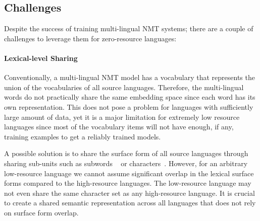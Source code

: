 \subsection{Challenges}
Despite the success of training multi-lingual NMT systems; there are a couple of challenges to leverage them for zero-resource languages:

\paragraph{Lexical-level Sharing} Conventionally, a multi-lingual NMT model has a vocabulary that represents the union of the vocabularies of all source languages. Therefore, the multi-lingual words do not practically share the same embedding space since each word has its own representation. This does not pose a problem for languages  with sufficiently large amount of  data, yet it is a major limitation for extremely low resource languages since most of the vocabulary items will not have enough, if any, training examples to get a reliably trained models.

A possible solution is to share the surface form of  all source languages through sharing sub-units such as subwords ~\cite{sennrich2015neural} or characters~\cite{kim2016character,luong2016achieving,lee2016fully}.  %
However, for an arbitrary low-resource language we cannot assume significant overlap in the lexical surface forms compared to the high-resource languages. The low-resource language may not even share the same character set as any high-resource language. It is crucial to create a shared semantic representation across all languages that does not rely on surface form overlap.

